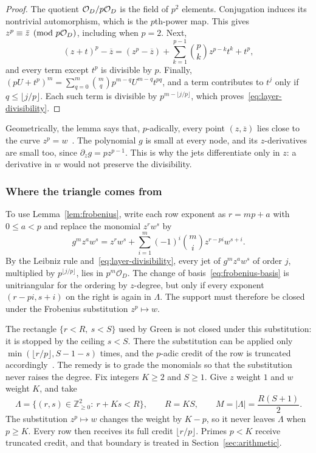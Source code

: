 \begin{proof}
The quotient $\mathcal O_D/p\mathcal O_D$ is the field of $p^2$ elements. Conjugation
induces its nontrivial automorphism, which is the $p$th-power map. This gives
$z^p\equiv\bar z\pmod{p\mathcal O_D}$, including when $p=2$. Next,
\[
  (z+t)^p-\overline z
  =(z^p-\overline z)+\sum_{k=1}^{p-1}\binom pkz^{p-k}t^k+t^p,
\]
and every term except $t^p$ is divisible by $p$. Finally,
$(pU+t^p)^m=\sum_{q=0}^m\binom mq p^{m-q}U^{m-q}t^{pq}$, and a term contributes
to $t^j$ only if $q\le\lfloor j/p\rfloor$. Each such term is divisible by
$p^{m-\lfloor j/p\rfloor}$, which proves~\eqref{eq:layer-divisibility}.
\end{proof}

Geometrically, the lemma says that, $p$-adically, every point
$(z,\overline z)$ lies close to the curve $z^p=w$~\cite{taosketch}.
The polynomial $g$ is small at every node, and its $z$-derivatives are small
too, since $\partial_z g=pz^{p-1}$. This is why the jets differentiate only in
$z$: a derivative in $w$ would not preserve the divisibility.

\subsubsection*{Where the triangle comes from}
To use Lemma~\ref{lem:frobenius}, write each row exponent as $r=mp+a$ with
$0\le a<p$ and replace the monomial $z^rw^s$ by
\begin{equation}\label{eq:frobenius-basis}
  g^m z^aw^s=z^rw^s+\sum_{i=1}^m(-1)^i\binom mi z^{r-pi}w^{s+i}.
\end{equation}
By the Leibniz rule and~\eqref{eq:layer-divisibility}, every jet of
$g^mz^aw^s$ of order $j$, multiplied by $p^{\lfloor j/p\rfloor}$, lies in
$p^m\mathcal{O}_D$. The change of basis~\eqref{eq:frobenius-basis} is
unitriangular for the ordering by $z$-degree, but only if every exponent
$(r-pi,s+i)$ on the right is again in $\Lambda$. The support must therefore be
closed under the Frobenius substitution $z^p\mapsto w$.

The rectangle $\{r<R,\ s<S\}$ used by Green is not closed under this
substitution: it is stopped by the ceiling $s<S$. There the substitution can be
applied only $\min(\lfloor r/p\rfloor,S-1-s)$ times, and the $p$-adic credit of
the row is truncated accordingly~\cite[Lemma~5.1]{green2026}. The remedy is to
grade the monomials so that the substitution never raises the degree. Fix integers $K\geq2$ and $S\geq1$. Give $z$
weight $1$ and $w$ weight $K$, and take
\begin{equation}\label{eq:triangle}
  \Lambda=\{(r,s)\in\mathbb{Z}_{\ge0}^2:\ r+Ks<R\},\qquad R=KS,\qquad
  M=|\Lambda|=\frac{R(S+1)}{2}.
\end{equation}
The substitution $z^p\mapsto w$ changes the weight by $K-p$, so it never leaves
$\Lambda$ when $p\ge K$. Every row then receives its full credit
$\lfloor r/p\rfloor$. Primes $p<K$ receive truncated credit, and that boundary
is treated in Section~\ref{sec:arithmetic}.

